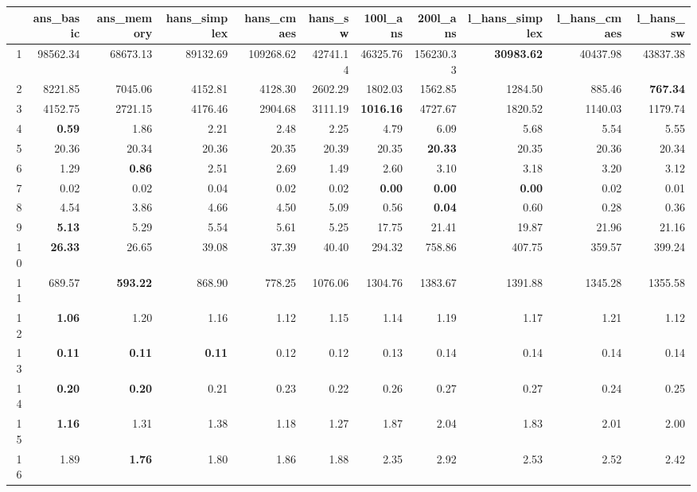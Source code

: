 \begin{table}[h!]
\centering
\begingroup\scriptsize
\begin{tabular}{rrrrrrrrrrr}
  \hline
 & ans\_basic & ans\_memory & hans\_simplex & hans\_cmaes & hans\_sw & 100l\_ans & 200l\_ans & l\_hans\_simplex & l\_hans\_cmaes & l\_hans\_sw \\ 
  \hline
1 & 98562.34 & 68673.13 & 89132.69 & 109268.62 & 42741.14 & 46325.76 & 156230.33 & \textbf{30983.62} & 40437.98 & 43837.38 \\ 
  2 & 8221.85 & 7045.06 & 4152.81 & 4128.30 & 2602.29 & 1802.03 & 1562.85 & 1284.50 & 885.46 & \textbf{767.34} \\ 
  3 & 4152.75 & 2721.15 & 4176.46 & 2904.68 & 3111.19 & \textbf{1016.16} & 4727.67 & 1820.52 & 1140.03 & 1179.74 \\ 
  4 & \textbf{0.59} & 1.86 & 2.21 & 2.48 & 2.25 & 4.79 & 6.09 & 5.68 & 5.54 & 5.55 \\ 
  5 & 20.36 & 20.34 & 20.36 & 20.35 & 20.39 & 20.35 & \textbf{20.33} & 20.35 & 20.36 & 20.34 \\ 
  6 & 1.29 & \textbf{0.86} & 2.51 & 2.69 & 1.49 & 2.60 & 3.10 & 3.18 & 3.20 & 3.12 \\ 
  7 & 0.02 & 0.02 & 0.04 & 0.02 & 0.02 & \textbf{0.00} & \textbf{0.00} & \textbf{0.00} & 0.02 & 0.01 \\ 
  8 & 4.54 & 3.86 & 4.66 & 4.50 & 5.09 & 0.56 & \textbf{0.04} & 0.60 & 0.28 & 0.36 \\ 
  9 & \textbf{5.13} & 5.29 & 5.54 & 5.61 & 5.25 & 17.75 & 21.41 & 19.87 & 21.96 & 21.16 \\ 
  10 & \textbf{26.33} & 26.65 & 39.08 & 37.39 & 40.40 & 294.32 & 758.86 & 407.75 & 359.57 & 399.24 \\ 
  11 & 689.57 & \textbf{593.22} & 868.90 & 778.25 & 1076.06 & 1304.76 & 1383.67 & 1391.88 & 1345.28 & 1355.58 \\ 
  12 & \textbf{1.06} & 1.20 & 1.16 & 1.12 & 1.15 & 1.14 & 1.19 & 1.17 & 1.21 & 1.12 \\ 
  13 & \textbf{0.11} & \textbf{0.11} & \textbf{0.11} & 0.12 & 0.12 & 0.13 & 0.14 & 0.14 & 0.14 & 0.14 \\ 
  14 & \textbf{0.20} & \textbf{0.20} & 0.21 & 0.23 & 0.22 & 0.26 & 0.27 & 0.27 & 0.24 & 0.25 \\ 
  15 & \textbf{1.16} & 1.31 & 1.38 & 1.18 & 1.27 & 1.87 & 2.04 & 1.83 & 2.01 & 2.00 \\ 
  16 & 1.89 & \textbf{1.76} & 1.80 & 1.86 & 1.88 & 2.35 & 2.92 & 2.53 & 2.52 & 2.42 \\ 

\end{tabular}
\end{table}
